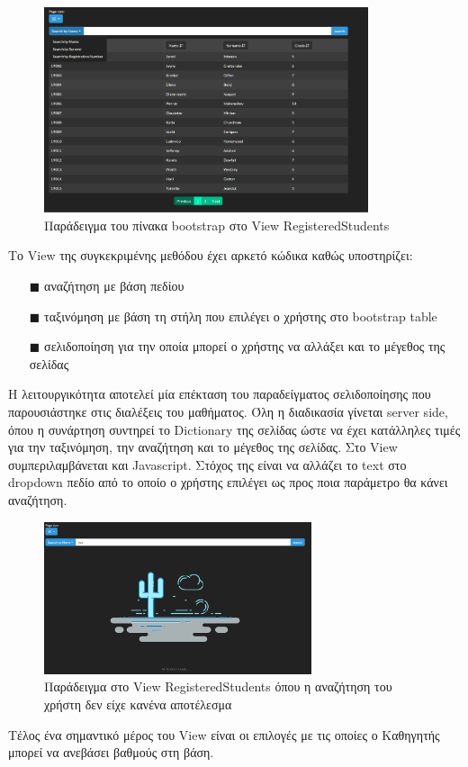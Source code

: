 \documentclass[12pt]{article}
\begin{document}
\begin{itemize}
	 \begin{figure}[H]
		\centering
		\includegraphics[width=0.85\textwidth]{pages1.png}
		\caption{Παράδειγμα του πίνακα bootstrap στο View RegisteredStudents}
	\end{figure}
	
	Το View της συγκεκριμένης μεθόδου έχει αρκετό κώδικα καθώς υποστηρίζει:
	\begin{itemize}
		\item[$\blacksquare$] αναζήτηση με βάση πεδίου
		\item[$\blacksquare$] ταξινόμηση με βάση τη στήλη που επιλέγει ο χρήστης στο bootstrap table
		\item[$\blacksquare$] σελιδοποίηση για την οποία μπορεί ο χρήστης να αλλάξει και το μέγεθος της σελίδας
	\end{itemize}
	
	Η λειτουργικότητα αποτελεί μία επέκταση του παραδείγματος σελιδοποίησης που παρουσιάστηκε στις διαλέξεις του μαθήματος. Όλη η διαδικασία γίνεται server side, όπου η συνάρτηση συντηρεί το Dictionary της σελίδας ώστε να έχει κατάλληλες τιμές για την ταξινόμηση, την αναζήτηση και το μέγεθος της σελίδας. Στο View συμπεριλαμβάνεται και Javascript. Στόχος της είναι να αλλάζει το text στο dropdown πεδίο από το οποίο ο χρήστης επιλέγει ως προς ποια παράμετρο θα κάνει αναζήτηση. 
	
	 \begin{figure}[H]
		\centering
		\includegraphics[width=0.7\textwidth]{empty2view.png}
		\caption{Παράδειγμα στο View RegisteredStudents όπου η αναζήτηση του χρήστη δεν είχε κανένα αποτέλεσμα}
	\end{figure}
	Τέλος ένα σημαντικό μέρος του View είναι οι επιλογές με τις οποίες ο Καθηγητής μπορεί να ανεβάσει βαθμούς στη βάση.
	

\end{itemize}
\end{document}
